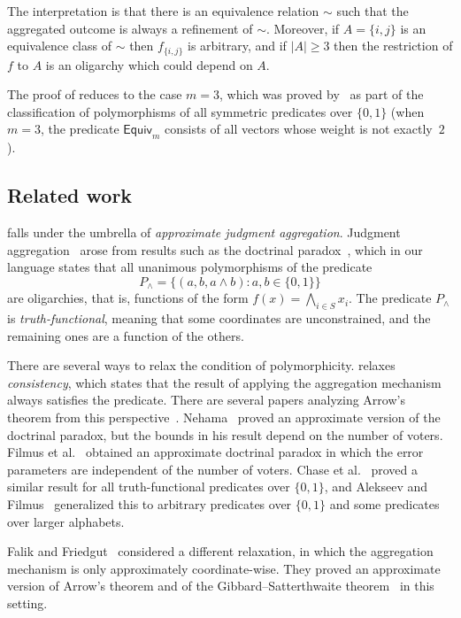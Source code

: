 \documentclass{article}
\providecommand{\Equiv}{\mathsf{Equiv}}
\theoremstyle{definition}
\theoremstyle{remark}
\begin{document}
The interpretation is that there is an equivalence relation $\sim$ such that the aggregated outcome is always a refinement of $\sim$. Moreover, if $A = \{i,j\}$ is an equivalence class of $\sim$ then $f_{\{i,j\}}$ is arbitrary, and if $|A| \ge 3$ then the restriction of $f$ to $A$ is an oligarchy which could depend on $A$.

The proof of  reduces to the case $m = 3$, which was proved by~\cite{Filmus26} as part of the classification of polymorphisms of all symmetric predicates over $\{0,1\}$ (when $m = 3$, the predicate $\Equiv_m$ consists of all vectors whose weight is not exactly~$2$).

\subsection{Related work}
\label{sec:related-work}

 falls under the umbrella of \emph{approximate judgment aggregation}. Judgment aggregation~\cite{ListPettit,ListPuppe} arose from results such as the doctrinal paradox~\cite{KornhauserSager,ListPettit}, which in our language states that all unanimous polymorphisms of the predicate
\[
 P_\land = \{(a,b,a \land b) : a,b \in \{0,1\}\}
\]
are oligarchies, that is, functions of the form $f(x) = \bigwedge_{i \in S} x_i$.
The predicate $P_\land$ is \emph{truth-functional}, meaning that some coordinates are unconstrained, and the remaining ones are a function of the others.

There are several ways to relax the condition of polymorphicity.  relaxes \emph{consistency}, which states that the result of applying the aggregation mechanism always satisfies the predicate.
There are several papers analyzing Arrow's theorem from this perspective~\cite{Kalai,Keller2010,Keller2012,Mossel12}.
Nehama~\cite{Nehama} proved an approximate version of the doctrinal paradox, but the bounds in his result depend on the number of voters. Filmus et al.~\cite{FLMM20} obtained an approximate doctrinal paradox in which the error parameters are independent of the number of voters. Chase et al.~\cite{CFMMS22} proved a similar result for all truth-functional predicates over $\{0,1\}$, and Alekseev and Filmus~\cite{AlekseevFilmus} generalized this to arbitrary predicates over $\{0,1\}$ and some predicates over larger alphabets.

Falik and Friedgut~\cite{FalikFriedgut} considered a different relaxation, in which the aggregation mechanism is only approximately coordinate-wise. They proved an approximate version of Arrow's theorem and of the Gibbard--Satterthwaite theorem~\cite{Gibbard,Satterthwaite} in this setting.
\end{document}

